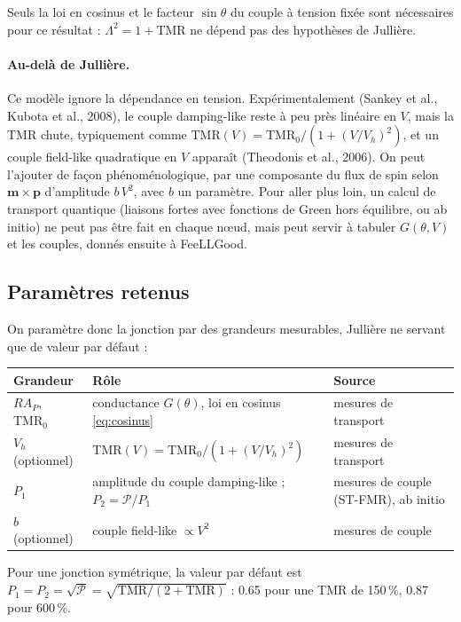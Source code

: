 \documentclass[11pt,a4paper]{article}
\newcommand{\vm}{\bm{m}}
\newcommand{\vp}{\bm{p}}
\begin{document}
Seuls la loi en cosinus et le facteur $\sin\theta$ du couple à tension
fixée sont nécessaires pour ce résultat : $\Lambda^2 = 1+\mathrm{TMR}$ ne
dépend pas des hypothèses de Jullière.

\paragraph{Au-delà de Jullière.} Ce modèle ignore la dépendance en tension.
Expérimentalement (Sankey et al., Kubota et al., 2008), le couple
damping-like reste à peu près linéaire en $V$, mais la TMR chute,
typiquement comme $\mathrm{TMR}(V) = \mathrm{TMR}_0/\left(1+(V/V_h)^2\right)$,
et un couple field-like quadratique en $V$ apparaît (Theodonis et al.,
2006). On peut l'ajouter de façon phénoménologique, par une composante du
flux de spin selon $\vm\times\vp$ d'amplitude $b\,V^2$, avec $b$ un
paramètre. Pour aller plus loin, un calcul de transport quantique
(liaisons fortes avec fonctions de Green hors équilibre, ou ab initio) ne
peut pas être fait en chaque nœud, mais peut servir à tabuler
$G(\theta, V)$ et les couples, donnés ensuite à FeeLLGood.

\subsection{Paramètres retenus}
\label{sec:tunnel-parametres}

On paramètre donc la jonction par des grandeurs mesurables, Jullière ne
servant que de valeur par défaut :
\begin{center}
\renewcommand{\arraystretch}{1.25}
\begin{tabular}{>{\raggedright}p{3.2cm}>{\raggedright}p{5.4cm}>{\raggedright\arraybackslash}p{5.0cm}}
  \toprule
  Grandeur & Rôle & Source \\
  \midrule
  $RA_P$, $\mathrm{TMR}_0$ & conductance $G(\theta)$, loi en cosinus
    \eqref{eq:cosinus} & mesures de transport \\
  $V_h$ (optionnel) & $\mathrm{TMR}(V) = \mathrm{TMR}_0/(1+(V/V_h)^2)$
    & mesures de transport \\
  $P_1$ & amplitude du couple damping-like ; $P_2 = \mathcal{P}/P_1$
    & mesures de couple (ST-FMR), ab initio \\
  $b$ (optionnel) & couple field-like $\propto V^2$ & mesures de couple \\
  \bottomrule
\end{tabular}
\end{center}
Pour une jonction symétrique, la valeur par défaut est
$P_1 = P_2 = \sqrt{\mathcal{P}} = \sqrt{\mathrm{TMR}/(2+\mathrm{TMR})}$ :
0.65 pour une TMR de 150\,\%, 0.87 pour 600\,\%.
\end{document}
